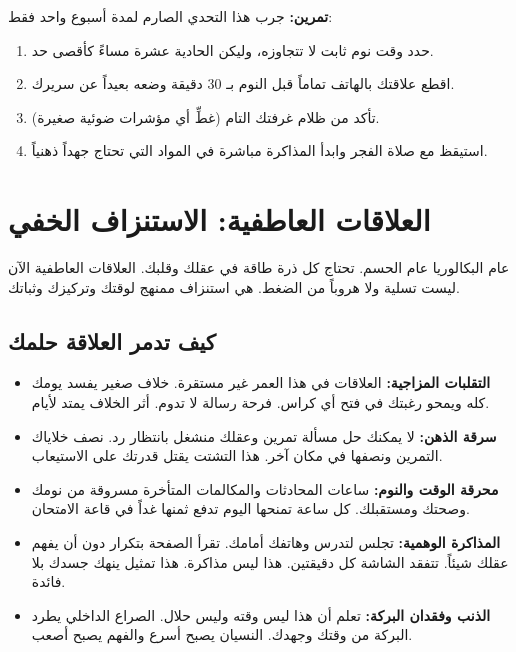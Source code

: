 \documentclass[12pt,a4paper]{book}
\newcommand{\exerciseAr}[1]{%
	\begin{exercise}
		\textbf{تمرين:} #1
	\end{exercise}
}
\begin{document}
\exerciseAr{
	جرب هذا التحدي الصارم لمدة أسبوع واحد فقط:
	\begin{enumerate}
		\item حدد وقت نوم ثابت لا تتجاوزه، وليكن الحادية عشرة مساءً كأقصى حد.
		\item اقطع علاقتك بالهاتف تماماً قبل النوم بـ 30 دقيقة وضعه بعيداً عن سريرك.
		\item تأكد من ظلام غرفتك التام (غطِّ أي مؤشرات ضوئية صغيرة).
		\item استيقظ مع صلاة الفجر وابدأ المذاكرة مباشرة في المواد التي تحتاج جهداً ذهنياً.
	\end{enumerate}
}
	
	\section{العلاقات العاطفية: الاستنزاف الخفي}
	\label{sec:relationships-drain}
	
	عام البكالوريا عام الحسم. تحتاج كل ذرة طاقة في عقلك وقلبك. العلاقات العاطفية الآن ليست تسلية ولا هروباً من الضغط. هي استنزاف ممنهج لوقتك وتركيزك وثباتك.
	
	\subsection{كيف تدمر العلاقة حلمك}
	
	\begin{itemize}
		\item \textbf{التقلبات المزاجية:} العلاقات في هذا العمر غير مستقرة. خلاف صغير يفسد يومك كله ويمحو رغبتك في فتح أي كراس. فرحة رسالة لا تدوم. أثر الخلاف يمتد لأيام.
		
		\item \textbf{سرقة الذهن:} لا يمكنك حل مسألة تمرين وعقلك منشغل بانتظار رد. نصف خلاياك التمرين ونصفها في مكان آخر. هذا التشتت يقتل قدرتك على الاستيعاب.
		
		\item \textbf{محرقة الوقت والنوم:} ساعات المحادثات والمكالمات المتأخرة مسروقة من نومك وصحتك ومستقبلك. كل ساعة تمنحها اليوم تدفع ثمنها غداً في قاعة الامتحان.
		
		\item \textbf{المذاكرة الوهمية:} تجلس لتدرس وهاتفك أمامك. تقرأ الصفحة بتكرار دون أن يفهم عقلك شيئاً. تتفقد الشاشة كل دقيقتين. هذا ليس مذاكرة. هذا تمثيل ينهك جسدك بلا فائدة.
		
		\item \textbf{الذنب وفقدان البركة:} تعلم أن هذا ليس وقته وليس حلال. الصراع الداخلي يطرد البركة من وقتك وجهدك. النسيان يصبح أسرع والفهم يصبح أصعب.
	\end{itemize}
	
\end{document}
